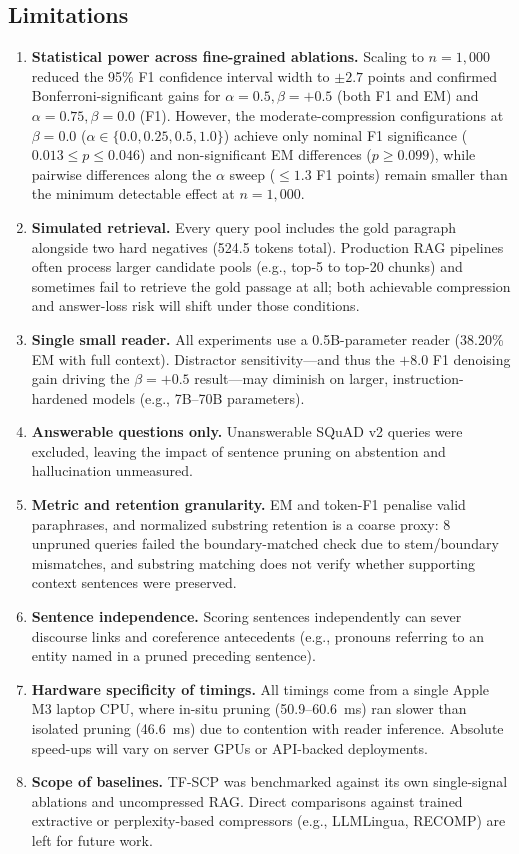 \documentclass[conference]{IEEEtran}
\begin{document}
\subsection{Limitations}

\begin{enumerate}
    \item \textbf{Statistical power across fine-grained ablations.} Scaling to $n = 1,000$ reduced the 95\% F1 confidence interval width to $\pm 2.7$ points and confirmed Bonferroni-significant gains for $\alpha = 0.5, \beta = +0.5$ (both F1 and EM) and $\alpha = 0.75, \beta = 0.0$ (F1). However, the moderate-compression configurations at $\beta = 0.0$ ($\alpha \in \{0.0, 0.25, 0.5, 1.0\}$) achieve only nominal F1 significance ($0.013 \le p \le 0.046$) and non-significant EM differences ($p \ge 0.099$), while pairwise differences along the $\alpha$ sweep ($\le 1.3$ F1 points) remain smaller than the minimum detectable effect at $n = 1,000$.
    \item \textbf{Simulated retrieval.} Every query pool includes the gold paragraph alongside two hard negatives (524.5 tokens total). Production RAG pipelines often process larger candidate pools (e.g., top-5 to top-20 chunks) and sometimes fail to retrieve the gold passage at all; both achievable compression and answer-loss risk will shift under those conditions.
    \item \textbf{Single small reader.} All experiments use a 0.5B-parameter reader (38.20\% EM with full context). Distractor sensitivity---and thus the $+8.0$ F1 denoising gain driving the $\beta = +0.5$ result---may diminish on larger, instruction-hardened models (e.g., 7B--70B parameters).
    \item \textbf{Answerable questions only.} Unanswerable SQuAD v2 queries were excluded, leaving the impact of sentence pruning on abstention and hallucination unmeasured.
    \item \textbf{Metric and retention granularity.} EM and token-F1 penalise valid paraphrases, and normalized substring retention is a coarse proxy: 8 unpruned queries failed the boundary-matched check due to stem/boundary mismatches, and substring matching does not verify whether supporting context sentences were preserved.
    \item \textbf{Sentence independence.} Scoring sentences independently can sever discourse links and coreference antecedents (e.g., pronouns referring to an entity named in a pruned preceding sentence).
    \item \textbf{Hardware specificity of timings.} All timings come from a single Apple M3 laptop CPU, where in-situ pruning (50.9--60.6~ms) ran slower than isolated pruning (46.6~ms) due to contention with reader inference. Absolute speed-ups will vary on server GPUs or API-backed deployments.
    \item \textbf{Scope of baselines.} TF-SCP was benchmarked against its own single-signal ablations and uncompressed RAG. Direct comparisons against trained extractive or perplexity-based compressors (e.g., LLMLingua, RECOMP) are left for future work.
\end{enumerate}
\end{document}
